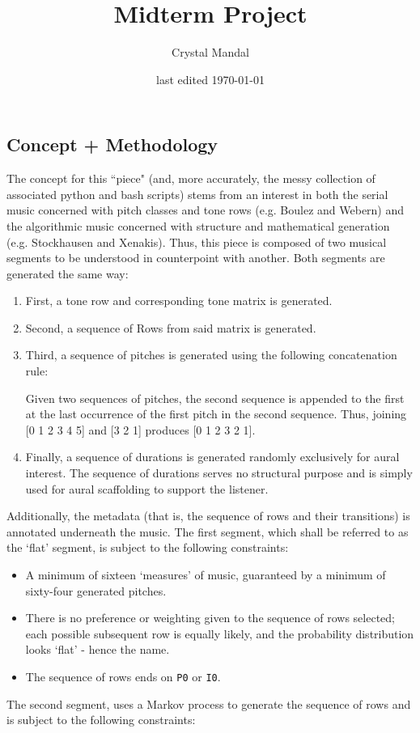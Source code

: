 \documentclass[10pt,letterpaper]{article}
\title{Midterm Project}
\author{Crystal Mandal}
\date{last edited \today}
\newcommand{\code}[1]{\colorbox{light-gray}{\texttt{#1}}}
\begin{document}
\maketitle

\subsection*{Concept + Methodology}
The concept for this ``piece" (and, more accurately, the
messy collection of associated python and bash scripts) stems
from an interest in both the serial music concerned with pitch
classes and tone rows (e.g. Boulez and Webern) and the algorithmic
music concerned with structure and mathematical generation (e.g.
Stockhausen and Xenakis). Thus, this piece is composed of two
musical segments to be understood in counterpoint with another.
Both segments are generated the same way:

\begin{enumerate}
  \item First, a tone row and corresponding tone matrix is generated.
  \item Second, a sequence of Rows from said matrix is generated.
  \item Third, a sequence of pitches is generated using the following concatenation rule:
    \begin{center}
      Given two sequences of pitches, the second sequence is appended to the
      first at the last occurrence of the first pitch in the second sequence. Thus,
    joining [0 1 2 3 4 5] and [3 2 1] produces [0 1 2 3 2 1].
    \end{center}
  \item Finally, a sequence of durations is generated randomly exclusively for
    aural interest. The sequence of durations serves no structural purpose and is
    simply used for aural scaffolding to support the listener.
\end{enumerate}

Additionally, the metadata (that is, the sequence of rows and their transitions)
is annotated underneath the music.
The first segment, which shall be referred to as the `flat' segment, is
subject to the following constraints:

\clearpage{}

\begin{itemize}
  \item{A minimum of sixteen `measures' of music, guaranteed by a minimum of
    sixty-four generated pitches.}
  \item{There is no preference or weighting given to the sequence of rows selected;
      each possible subsequent row is equally likely, and the probability
      distribution looks `flat' - hence the name.}
  \item{The sequence of rows ends on \code{P0} or \code{I0}. }
\end{itemize}
The second segment, uses a Markov process to generate the sequence of rows and
is subject to the following constraints:
\end{document}
